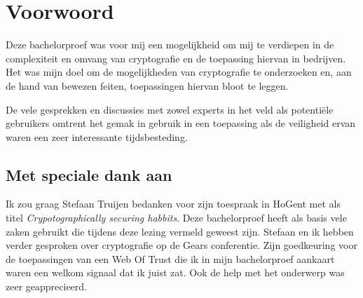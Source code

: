 
\chapter*{Voorwoord}
\label{ch:voorwoord}


Deze bachelorproef was voor mij een mogelijkheid om mij te verdiepen in de
complexiteit en omvang van cryptografie en de toepassing hiervan in bedrijven.
Het was mijn doel om de mogelijkheden van cryptografie te onderzoeken en, aan de
hand van bewezen feiten, toepassingen hiervan bloot te leggen.

De vele gesprekken en discussies met zowel experts in het veld als potentiële
gebruikers omtrent het gemak in gebruik in een toepassing als de veiligheid
ervan waren een zeer interessante tijdsbesteding.

\section*{Met speciale dank aan}
Ik zou graag Stefaan Truijen bedanken voor zijn toespraak in HoGent met als
titel \textit{Crypotographically securing habbits}. Deze bachelorproef heeft als
basis vele zaken gebruikt die tijdens deze lezing vermeld geweest zijn. Stefaan
en ik hebben verder gesproken over cryptografie op de Gears conferentie. Zijn
goedkeuring voor de toepassingen van een Web Of Trust die ik in mijn
bachelorproef aankaart waren een welkom signaal dat ik juist zat. Ook de help
met het onderwerp \textit{}  was
zeer geapprecieerd.
